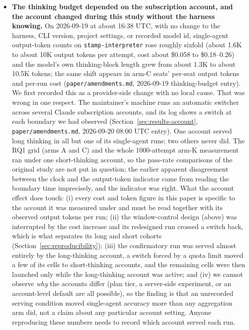 \begin{itemize}
\item \textbf{The thinking budget depended on the subscription account, and the account changed
  during this study without the harness knowing.} On 2026-09-19 at about 16:38 UTC, with no change to
  the harness, CLI version, project settings, or recorded model id, single-agent output-token counts on
  \texttt{stamp-interpreter} rose roughly sixfold (about 1.6K to about 10K output tokens per attempt,
  cost about \$0.058 to \$0.18--0.26) and the model's own thinking-block length grew from about 1.3K to
  about 10.5K tokens; the same shift appears in arm-C seats' per-seat output tokens and per-run cost
  (\texttt{paper/amendments.md}, 2026-09-19 thinking-budget entry). We first recorded this as a
  provider-side change with no local cause. That was wrong in one respect. The maintainer's machine runs
  an automatic switcher across several Claude subscription accounts, and its log shows a switch at each
  boundary we had observed (Section~\ref{sec:results-account}, \texttt{paper/amendments.md}, 2026-09-20
  08:00 UTC entry). One account served long thinking in all but one of its single-agent runs; two others
  never did. The RQ1 grid (arms A and C) and the whole 1000-attempt arm-K measurement ran under one
  short-thinking account, so the pass-rate comparisons of the original study are not put in question;
  the earlier apparent disagreement between the clock and the output-token indicator came from reading
  the boundary time imprecisely, and the indicator was right. What the account effect does touch:
  (i) every cost and token figure in this paper is specific to the account it was measured under and
  must be read together with its observed output tokens per run; (ii) the window-control design (above)
  was interrupted by the cost increase and its redesigned run crossed a switch back, which is what
  separates its long and short cohorts (Section~\ref{sec:reproducibility}); (iii) the confirmatory run
  was served almost entirely by the long-thinking account, a switch forced by a quota limit moved a few
  of its cells to short-thinking accounts, and the remaining cells were then launched only while the
  long-thinking account was active; and (iv) we cannot observe \emph{why} the accounts differ (plan
  tier, a server-side experiment, or an account-level default are all possible), so the finding is that
  an unrecorded serving condition moved single-agent accuracy more than any aggregation arm did, not a
  claim about any particular account setting. Anyone reproducing these numbers needs to record which
  account served each run.


\end{itemize}

